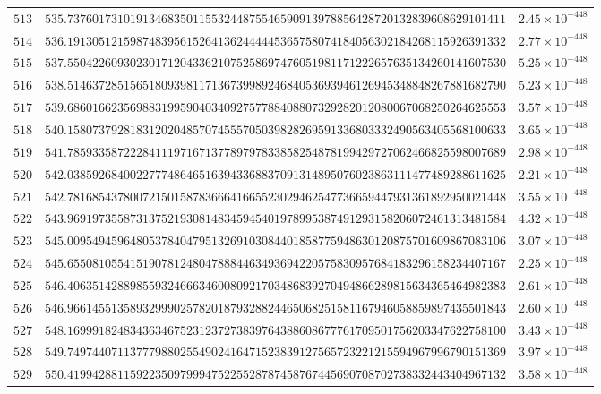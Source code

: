 \documentclass[12pt,reqno]{amsart}
\theoremstyle{remark}
\begin{document}
\begin{longtable}{clc}
$513$ & $535.7376017310191346835011553244875546590913978856428720132839608629101411$ & $2.45\times 10^{-448}$ \\
$514$ & $536.1913051215987483956152641362444445365758074184056302184268115926391332$ & $2.77\times 10^{-448}$ \\
$515$ & $537.5504226093023017120433621075258697476051981171222657635134260141607530$ & $5.25\times 10^{-448}$ \\
$516$ & $538.5146372851565180939811713673998924684053693946126945348848267881682790$ & $5.23\times 10^{-448}$ \\
$517$ & $539.6860166235698831995904034092757788408807329282012080067068250264625553$ & $3.57\times 10^{-448}$ \\
$518$ & $540.1580737928183120204857074555705039828269591336803332490563405568100633$ & $3.65\times 10^{-448}$ \\
$519$ & $541.7859335872228411197167137789797833858254878199429727062466825598007689$ & $2.98\times 10^{-448}$ \\
$520$ & $542.0385926840022777486465163943368837091314895076023863111477489288611625$ & $2.21\times 10^{-448}$ \\
$521$ & $542.7816854378007215015878366641665523029462547736659447931361892950021448$ & $3.55\times 10^{-448}$ \\
$522$ & $543.9691973558731375219308148345945401978995387491293158206072461313481584$ & $4.32\times 10^{-448}$ \\
$523$ & $545.0095494596480537840479513269103084401858775948630120875701609867083106$ & $3.07\times 10^{-448}$ \\
$524$ & $545.6550810554151907812480478884463493694220575830957684183296158234407167$ & $2.25\times 10^{-448}$ \\
$525$ & $546.4063514288985593246663460080921703486839270494866289815634365464982383$ & $2.61\times 10^{-448}$ \\
$526$ & $546.9661455135893299902578201879328824465068251581167946058859897435501843$ & $2.60\times 10^{-448}$ \\
$527$ & $548.1699918248343634675231237273839764388608677761709501756203347622758100$ & $3.43\times 10^{-448}$ \\
$528$ & $549.7497440711377798802554902416471523839127565723221215594967996790151369$ & $3.97\times 10^{-448}$ \\
$529$ & $550.4199428811592235097999475225528787458767445690708702738332443404967132$ & $3.58\times 10^{-448}$ \\

\end{longtable}
\end{document}
